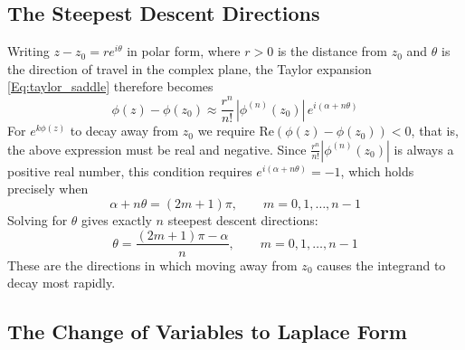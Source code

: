 \subsection{The Steepest Descent Directions}

Writing $z - z_0 = re^{i\theta}$ in polar form, where $r > 0$ is the distance from $z_0$ and $\theta$ is the direction of travel in the complex plane, the Taylor expansion \eqref{Eq:taylor_saddle} therefore becomes$$\phi(z) - \phi(z_0) \approx \frac{r^n}{n!}\,|\phi^{(n)}(z_0)|\,e^{i(\alpha + n\theta)}$$For $e^{k\phi(z)}$ to decay away from $z_0$ we require $\text{Re}(\phi(z) - \phi(z_0)) < 0$, that is, the above expression must be real and negative. Since $\frac{r^n}{n!}|\phi^{(n)}(z_0)|$ is always a positive real number, this condition requires $e^{i(\alpha + n\theta)} = -1$, which holds precisely when$$\alpha + n\theta = (2m+1)\pi, \qquad m = 0, 1, \ldots, n-1$$Solving for $\theta$ gives exactly $n$ steepest descent directions:
\begin{equation}\label{Eq:descent_directions}
    \theta = \frac{(2m+1)\pi - \alpha}{n}, \qquad m = 0, 1, \ldots, n-1
\end{equation}
These are the directions in which moving away from $z_0$ causes the integrand to decay most rapidly. \cite{RedBook,Asymptotic,Steepestdescent,Steepestorigin, olver1997}

\subsection{The Change of Variables to Laplace Form}

